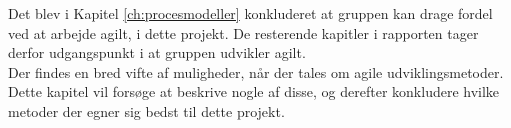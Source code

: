 Det blev i Kapitel \ref{ch:procesmodeller} konkluderet at gruppen kan drage fordel ved at
arbejde agilt, i dette projekt. De resterende kapitler i rapporten tager derfor udgangspunkt i at gruppen
udvikler agilt. \\ 

Der findes en bred vifte af muligheder, når der tales om agile udviklingsmetoder. Dette kapitel vil forsøge 
at beskrive nogle af disse, og derefter konkludere hvilke metoder der egner sig bedst til dette projekt.